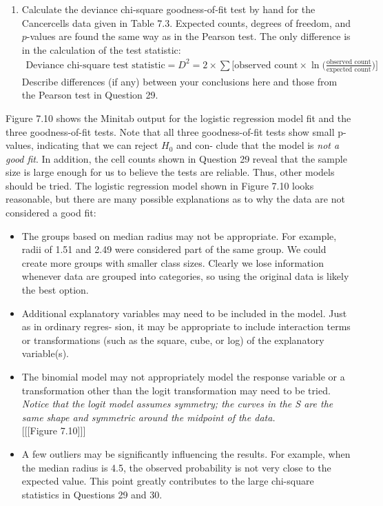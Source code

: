 \documentclass[
]{report}
\providecommand{\tightlist}{%
  \setlength{\itemsep}{0pt}\setlength{\parskip}{0pt}}
\begin{document}
\begin{enumerate}
\def\labelenumi{\arabic{enumi}.}
\setcounter{enumi}{29}
\tightlist
\item
  Calculate the deviance chi‐square goodness‐of‐fit test by hand for the Cancercells data given in Table 7.3. Expected counts, degrees of freedom, and \(p\)-values are found the same way as in the Pearson test. The only difference is in the calculation of the test statistic:\\
  \begin{align}
     \text{Deviance chi-square test statistic} = D^2 = 2 \times \sum \biggl[\text{observed count} \times \ln\bigl(\frac{\text{observed count}}{\text{expected count}}\bigr)\biggr]
     \tag{7.26}
     \end{align}
  Describe differences (if any) between your conclusions here and those from the Pearson test in Question 29.
\end{enumerate}

Figure 7.10 shows the Minitab output for the logistic regression model fit and the three goodness-of-fit tests.
Note that all three goodness-of-fit tests show small p-values, indicating that we can reject \(H_0\) and con-
clude that the model is \emph{not a good fit}. In addition, the cell counts shown in Question 29 reveal that the sample
size is large enough for us to believe the tests are reliable. Thus, other models should be tried. The logistic
regression model shown in Figure 7.10 looks reasonable, but there are many possible explanations as to why
the data are not considered a good fit:

\begin{itemize}
\item
  The groups based on median radius may not be appropriate. For example, radii of 1.51 and 2.49 were
  considered part of the same group. We could create more groups with smaller class sizes. Clearly we lose
  information whenever data are grouped into categories, so using the original data is likely the best option.
\item
  Additional explanatory variables may need to be included in the model. Just as in ordinary regres-
  sion, it may be appropriate to include interaction terms or transformations (such as the square, cube,
  or log) of the explanatory variable(s).
\item
  The binomial model may not appropriately model the response variable or a transformation other
  than the logit transformation may need to be tried. \emph{Notice that the logit model assumes symmetry; the curves in the S are the same shape and symmetric around the midpoint of the data.}\\
  {[}{[}{[}Figure 7.10{]}{]}{]}
\item
  A few outliers may be significantly influencing the results. For example, when the median radius is
  4.5, the observed probability is not very close to the expected value. This point greatly contributes to
  the large chi-square statistics in Questions 29 and 30.
\end{itemize}
\end{document}
